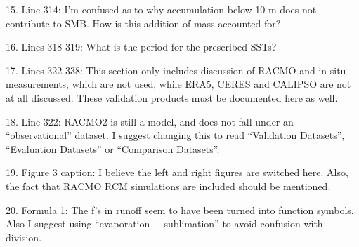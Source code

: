 \documentclass[12pt,oneside,a4paper]{article}%
\begin{document}
15. Line 314: I’m confused as to why accumulation below 10 m does not contribute to SMB. How is this addition of mass accounted for? \newline

{\color{blue}{The internally computed SMB is a bit strange, in that only tracks ice. It does not consider the overlying 10m of snow to contribute to the SMB. In response to the other reviewer, we've clarified this in sections 2.5.}} \newline

16. Lines 318-319: What is the period for the prescribed SSTs? \newline

{\color{blue}{Perpetual 1979. Added this in parantheses.}} \newline

17. Lines 322-338: This section only includes discussion of RACMO and in-situ measurements, which are not used, while ERA5, CERES and CALIPSO are not at all discussed. These validation products must be documented here as well. \newline

{\color{blue}{Fixed.}} \newline

18. Line 322: RACMO2 is still a model, and does not fall under an “observational” dataset. I suggest changing this to read “Validation Datasets”, “Evaluation Datasets” or “Comparison Datasets”. \newline

{\color{blue}{Changed to validation dataset throughout the manuscript.}} \newline

19. Figure 3 caption: I believe the left and right figures are switched here. Also, the fact that RACMO RCM simulations are included should be mentioned. \newline

{\color{blue}{Fixed, and included references to the RACMO grids in the text and figure caption.}} \newline

20. Formula 1: The f’s in runoff seem to have been turned into function symbols. Also I suggest using “evaporation + sublimation” to avoid confusion with division. \newline

{\color{blue}{Switched to type writer font. Used reviewers suggestion to replace slash with a plus sign.}} \newline
\end{document}
